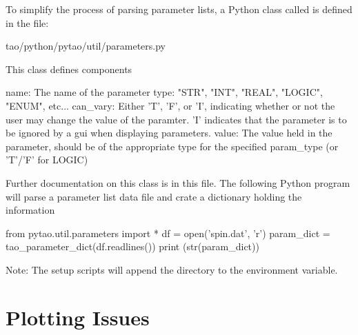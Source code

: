 To simplify the process of parsing parameter lists, a Python class called  is
defined in the file:
\begin{example}
  tao/python/pytao/util/parameters.py
\end{example}
This class defines components
\begin{example}
    name:       The name of the parameter
    type:       "STR", "INT", "REAL", "LOGIC", "ENUM", etc...
    can_vary:   Either 'T', 'F', or 'I', indicating whether or not the
                user may change the value of the paramter. 'I' indicates
                that the parameter is to be ignored by a gui when displaying parameters.
    value:      The value held in the parameter, should be of the
                appropriate type for the specified param_type
                (or 'T'/'F' for LOGIC)
\end{example}
Further documentation on this class is in this file. The following Python program will parse a parameter
list data file and crate a dictionary holding the information
\begin{example}
  from pytao.util.parameters import *
  df = open('spin.dat', 'r')
  param_dict = tao_parameter_dict(df.readlines())
  print (str(param_dict))
\end{example}
Note: The \bmad setup scripts will append the directory  to the 
environment variable.


\section{Plotting Issues}
\label{s:gui.plot}

